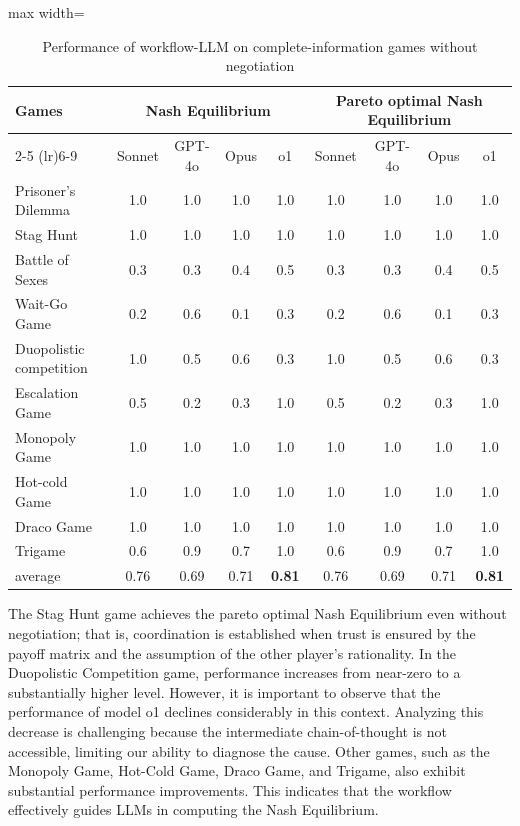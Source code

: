 \begin{table}[!ht]
    \centering
    \begin{adjustbox}{max width=\textwidth}
    \begin{tabular}{lc c c c c c c c}
    \toprule
         \multirow{2.5}{*}{\textbf{Games}} & \multicolumn{4}{c}{\bf Nash Equilibrium} & \multicolumn{4}{c}{\bf Pareto optimal Nash Equilibrium} \\ \cmidrule(lr){2-5}  \cmidrule(lr){6-9} 
           & Sonnet & GPT-4o & Opus & o1 & Sonnet & GPT-4o & Opus & o1  \\
           \midrule
        Prisoner's Dilemma & 1.0 & 1.0 & 1.0 & 1.0 & 1.0 & 1.0 & 1.0 & 1.0 \\
        Stag Hunt & 1.0 & 1.0 & 1.0 & 1.0 & 1.0 & 1.0 & 1.0 & 1.0 \\
        Battle of Sexes  & 0.3 & 0.3 & 0.4 & 0.5 & 0.3 & 0.3 & 0.4 & 0.5\\
        Wait-Go Game & 0.2 & 0.6 & 0.1 & 0.3 & 0.2 & 0.6 & 0.1 & 0.3\\
        Duopolistic competition & 1.0 & 0.5 & 0.6 & 0.3 & 1.0 & 0.5 & 0.6 & 0.3 \\
        Escalation Game & 0.5 & 0.2 & 0.3 & 1.0 & 0.5 & 0.2 & 0.3 & 1.0\\
        Monopoly Game & 1.0 & 1.0 & 1.0 & 1.0 & 1.0 & 1.0 & 1.0 & 1.0\\
        Hot-cold Game & 1.0 & 1.0 & 1.0 & 1.0 & 1.0 & 1.0 & 1.0 & 1.0\\
        Draco Game & 1.0 & 1.0 & 1.0 & 1.0 & 1.0 & 1.0 & 1.0 & 1.0 \\
        Trigame & 0.6 & 0.9 & 0.7 & 1.0 & 0.6 & 0.9 & 0.7 & 1.0 \\
        \midrule
        average & 0.76 & 0.69 & 0.71 & \textbf{0.81} & 0.76 & 0.69 & 0.71 & \textbf{0.81}\\
        \bottomrule
    \end{tabular}
    \end{adjustbox}
    \caption{Performance of workflow-LLM on complete-information games without negotiation}
    \label{tab:classic_wo_neg_w_wf}
\end{table}

The Stag Hunt game achieves the pareto optimal Nash Equilibrium even without negotiation; that is, coordination is established when trust is ensured by the payoff matrix and the assumption of the other player's rationality. In the Duopolistic Competition game, performance increases from near-zero to a substantially higher level. However, it is important to observe that the performance of model o1 declines considerably in this context. Analyzing this decrease is challenging because the intermediate chain-of-thought is not accessible, limiting our ability to diagnose the cause. Other games, such as the Monopoly Game, Hot-Cold Game, Draco Game, and Trigame, also exhibit substantial performance improvements. This indicates that the workflow effectively guides LLMs in computing the Nash Equilibrium.

